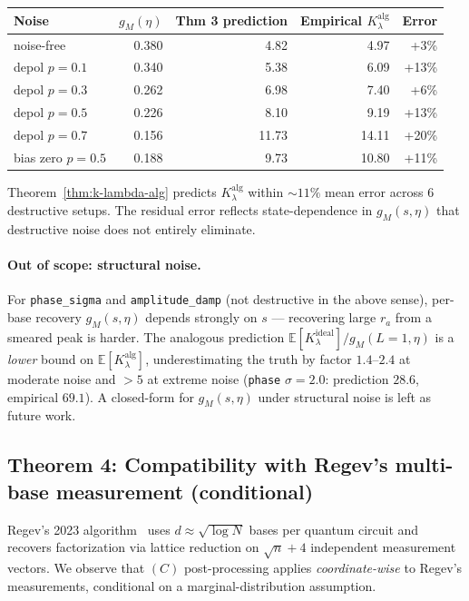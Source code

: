 \documentclass[11pt]{article}
\begin{document}
\begin{center}
\begin{tabular}{lrrrr}
\toprule
Noise & $g_M(\eta)$ & Thm 3 prediction & Empirical $K_\lambda^{\text{alg}}$ & Error \\
\midrule
noise-free          & 0.380 &  4.82 &  4.97 & +3\% \\
depol $p=0.1$       & 0.340 &  5.38 &  6.09 & +13\% \\
depol $p=0.3$       & 0.262 &  6.98 &  7.40 & +6\% \\
depol $p=0.5$       & 0.226 &  8.10 &  9.19 & +13\% \\
depol $p=0.7$       & 0.156 & 11.73 & 14.11 & +20\% \\
bias zero $p=0.5$   & 0.188 &  9.73 & 10.80 & +11\% \\
\bottomrule
\end{tabular}
\end{center}

Theorem~\ref{thm:k-lambda-alg} predicts $K_\lambda^{\text{alg}}$ within $\sim 11\%$ mean error across 6 destructive setups. The residual error reflects state-dependence in $g_M(s, \eta)$ that destructive noise does not entirely eliminate.

\paragraph{Out of scope: structural noise.} For \texttt{phase\_sigma} and \texttt{amplitude\_damp} (not destructive in the above sense), per-base recovery $g_M(s, \eta)$ depends strongly on $s$ --- recovering large $r_a$ from a smeared peak is harder. The analogous prediction $\mathbb{E}[K_\lambda^{\text{ideal}}] / g_M(L=1, \eta)$ is a \emph{lower} bound on $\mathbb{E}[K_\lambda^{\text{alg}}]$, underestimating the truth by factor $1.4$--$2.4$ at moderate noise and $> 5$ at extreme noise (\texttt{phase} $\sigma = 2.0$: prediction $28.6$, empirical $69.1$). A closed-form for $g_M(s, \eta)$ under structural noise is left as future work.

\subsection{Theorem 4: Compatibility with Regev's multi-base measurement (conditional)}

Regev's 2023 algorithm~\cite{regev2023} uses $d \approx \sqrt{\log N}$ bases per quantum circuit and recovers factorization via lattice reduction on $\sqrt{n} + 4$ independent measurement vectors. We observe that $(C)$ post-processing applies \emph{coordinate-wise} to Regev's measurements, conditional on a marginal-distribution assumption.
\end{document}
